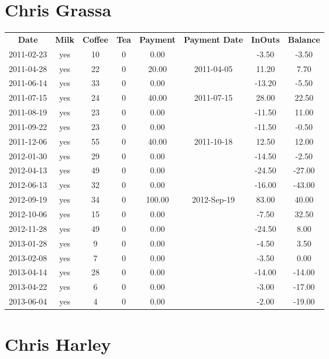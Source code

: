 \section{Chris Grassa}

\begin{center}
\begin{tabular}{cccccccc}
\textbf{Date} & \textbf{Milk} & \textbf{Coffee} & \textbf{Tea} & \textbf{Payment} & \textbf{Payment Date} & \textbf{InOuts} & \textbf{Balance} \\
2011-02-23 & yes & 10 & 0 &   0.00 &  &  -3.50 &  -3.50\\ 
2011-04-28 & yes & 22 & 0 &  20.00 & 2011-04-05 &  11.20 &   7.70\\ 
2011-06-14 & yes & 33 & 0 &   0.00 &  & -13.20 &  -5.50\\ 
2011-07-15 & yes & 24 & 0 &  40.00 & 2011-07-15 &  28.00 &  22.50\\ 
2011-08-19 & yes & 23 & 0 &   0.00 &  & -11.50 &  11.00\\ 
2011-09-22 & yes & 23 & 0 &   0.00 &  & -11.50 &  -0.50\\ 
2011-12-06 & yes & 55 & 0 &  40.00 & 2011-10-18 &  12.50 &  12.00\\ 
2012-01-30 & yes & 29 & 0 &   0.00 &  & -14.50 &  -2.50\\ 
2012-04-13 & yes & 49 & 0 &   0.00 &  & -24.50 & -27.00\\ 
2012-06-13 & yes & 32 & 0 &   0.00 &  & -16.00 & -43.00\\ 
2012-09-19 & yes & 34 & 0 & 100.00 & 2012-Sep-19 &  83.00 &  40.00\\ 
2012-10-06 & yes & 15 & 0 &   0.00 &  &  -7.50 &  32.50\\ 
2012-11-28 & yes & 49 & 0 &   0.00 &  & -24.50 &   8.00\\ 
2013-01-28 & yes &  9 & 0 &   0.00 &  &  -4.50 &   3.50\\ 
2013-02-08 & yes &  7 & 0 &   0.00 &  &  -3.50 &   0.00\\ 
2013-04-14 & yes & 28 & 0 &   0.00 &  & -14.00 & -14.00\\ 
2013-04-22 & yes &  6 & 0 &   0.00 &  &  -3.00 & -17.00\\ 
2013-06-04 & yes &  4 & 0 &   0.00 &  &  -2.00 & -19.00
\end{tabular}
\end{center}

\section{Chris Harley}

